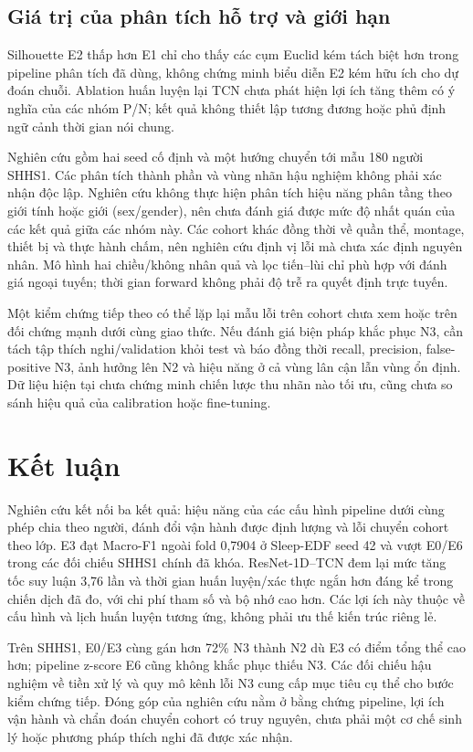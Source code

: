 \documentclass[10pt,a4paper]{article}
\begin{document}
\subsection{Giá trị của phân tích hỗ trợ và giới hạn}

Silhouette E2 thấp hơn E1 chỉ cho thấy các cụm Euclid kém tách biệt hơn trong pipeline phân tích đã dùng, không chứng minh biểu diễn E2 kém hữu ích cho dự đoán chuỗi. Ablation huấn luyện lại TCN chưa phát hiện lợi ích tăng thêm có ý nghĩa của các nhóm P/N; kết quả không thiết lập tương đương hoặc phủ định ngữ cảnh thời gian nói chung.

Nghiên cứu gồm hai seed cố định và một hướng chuyển tới mẫu 180 người SHHS1. Các phân tích thành phần và vùng nhãn hậu nghiệm không phải xác nhận độc lập. Nghiên cứu không thực hiện phân tích hiệu năng phân tầng theo giới tính hoặc giới (sex/gender), nên chưa đánh giá được mức độ nhất quán của các kết quả giữa các nhóm này. Các cohort khác đồng thời về quần thể, montage, thiết bị và thực hành chấm, nên nghiên cứu định vị lỗi mà chưa xác định nguyên nhân. Mô hình hai chiều/không nhân quả và lọc tiến--lùi chỉ phù hợp với đánh giá ngoại tuyến; thời gian forward không phải độ trễ ra quyết định trực tuyến.

Một kiểm chứng tiếp theo có thể lặp lại mẫu lỗi trên cohort chưa xem hoặc trên đối chứng mạnh dưới cùng giao thức. Nếu đánh giá biện pháp khắc phục N3, cần tách tập thích nghi/validation khỏi test và báo đồng thời recall, precision, false-positive N3, ảnh hưởng lên N2 và hiệu năng ở cả vùng lân cận lẫn vùng ổn định. Dữ liệu hiện tại chưa chứng minh chiến lược thu nhãn nào tối ưu, cũng chưa so sánh hiệu quả của calibration hoặc fine-tuning.

\section{Kết luận}

Nghiên cứu kết nối ba kết quả: hiệu năng của các cấu hình pipeline dưới cùng phép chia theo người, đánh đổi vận hành được định lượng và lỗi chuyển cohort theo lớp. E3 đạt Macro-F1 ngoài fold 0,7904 ở Sleep-EDF seed 42 và vượt E0/E6 trong các đối chiếu SHHS1 chính đã khóa. ResNet-1D--TCN đem lại mức tăng tốc suy luận 3,76 lần và thời gian huấn luyện/xác thực ngắn hơn đáng kể trong chiến dịch đã đo, với chi phí tham số và bộ nhớ cao hơn. Các lợi ích này thuộc về cấu hình và lịch huấn luyện tương ứng, không phải ưu thế kiến trúc riêng lẻ.

Trên SHHS1, E0/E3 cùng gán hơn 72\% N3 thành N2 dù E3 có điểm tổng thể cao hơn; pipeline z-score E6 cũng không khắc phục thiếu N3. Các đối chiếu hậu nghiệm về tiền xử lý và quy mô kênh lỗi N3 cung cấp mục tiêu cụ thể cho bước kiểm chứng tiếp. Đóng góp của nghiên cứu nằm ở bằng chứng pipeline, lợi ích vận hành và chẩn đoán chuyển cohort có truy nguyên, chưa phải một cơ chế sinh lý hoặc phương pháp thích nghi đã được xác nhận.
\end{document}
